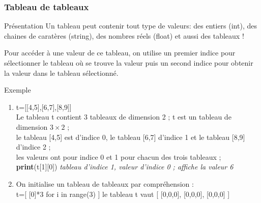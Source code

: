 \documentclass[9pt]{beamer}
\newcounter{num}
\begin{document}
\begin{frame}
\frametitle{Tableau de tableaux}

\begin{block}{Présentation}
Un tableau peut contenir tout type de valeurs: des entiers (int), des chaines de caratères (string), des nombres réels (float) et aussi des tableaux !\medskip

Pour accéder à une valeur de ce tableau, on utilise un premier indice pour sélectionner le tableau où se trouve la valeur puis un second indice pour obtenir la valeur dans le tableau sélectionné.
\end{block}

\begin{exampleblock}{Exemple}
\begin{enumerate}
\item t=[[4,5],[6,7],[8,9]]\\
Le tableau t contient 3 tableaux de dimension 2 ; t est un tableau de dimension $3 \times 2$ ;\\
le tableau [4,5] est d'indice 0, le tableau [6,7] d'indice 1 et le tableau [8,9] d'indice 2 ;\\
les valeurs ont pour indice 0 et 1 pour chacun des trois tableaux ;\\

\textbf{print}(t[1][0]) \hspace{1cm} \textit{tableau d'indice 1, valeur d'indice 0 ; affiche la valeur 6}
\item On initialise un tableau de tableaux par compréhension :\\
t=[ [0]*3 for i in range(3) ] \hspace{1cm} le tableau t vaut [ [0,0,0], [0,0,0], [0,0,0] ]
\end{enumerate}

\end{exampleblock}

\end{frame}
\end{document}
